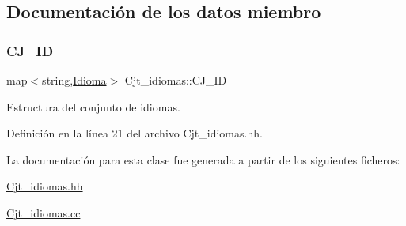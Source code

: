 \subsection{Documentación de los datos miembro}
\mbox{\label{class_cjt__idiomas_aeb67a7100b1345a160fb85466bd4e5f6}} 
\subsubsection{\texorpdfstring{C\+J\+\_\+\+ID}{CJ\_ID}}
{\footnotesize\ttfamily map$<$string,\hyperlink{class_idioma}{Idioma}$>$ Cjt\+\_\+idiomas\+::\+C\+J\+\_\+\+ID\hspace{0.3cm}{\ttfamily [private]}}



Estructura del conjunto de idiomas. 



Definición en la línea 21 del archivo Cjt\+\_\+idiomas.\+hh.



La documentación para esta clase fue generada a partir de los siguientes ficheros\+:\begin{DoxyCompactItemize}
\item 
\hyperlink{_cjt__idiomas_8hh}{Cjt\+\_\+idiomas.\+hh}\item 
\hyperlink{_cjt__idiomas_8cc}{Cjt\+\_\+idiomas.\+cc}\end{DoxyCompactItemize}
